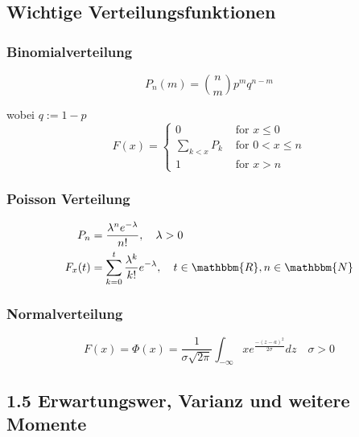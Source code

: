 \documentclass[a4paper]{article}
\theoremstyle{definition}
\theoremstyle{remark}
\begin{document}
\subsection{Wichtige Verteilungsfunktionen}
\label{sub:wichtige_verteilungsfunktionen}
\subsubsection*{Binomialverteilung}
\label{ssub:binomialverteilung}
\begin{equation}
P_n(m)= \binom{n}{m} p^mq^{n-m}
\end{equation}

 wobei $q:=1-p$\\
\begin{equation}
F(x)=
\begin{cases}
 0 		&\textrm{ for } x\leq 0\\
\sum_{k<x}P_k 	&\textrm{ for } 0<x\leq n\\
1 		&\textrm{ for  } x>n
\end{cases}
\end{equation}




\subsubsection*{Poisson Verteilung}
\label{ssub:poisson_verteilung}
\begin{equation}
  \begin{split}
  P_n&= \frac{\lambda ^ne^{-\lambda }}{n!},\quad \lambda >0 \\ F_x(t)&=\sum_{k=0}^{t}\frac{\lambda ^k}{k!}e^{-\lambda },\quad t\in \mathbbm{R}, n\in \mathbbm{N}
  \end{split}
\end{equation}	

\subsubsection*{Normalverteilung}
\label{ssub:normalverteilung}
\begin{equation}
F(x)=\Phi (x)=\frac{1}{\sigma \sqrt{2\pi}} \int_{-\infty}{x}e^{\frac{-(z-a)^2}{2\sigma }}dz\quad \sigma >0
\end{equation}

 \subsection{1.5 Erwartungswer, Varianz und weitere Momente}
\label{sub:erwartungswer_varianz_und_witere_momente}
\end{document}
